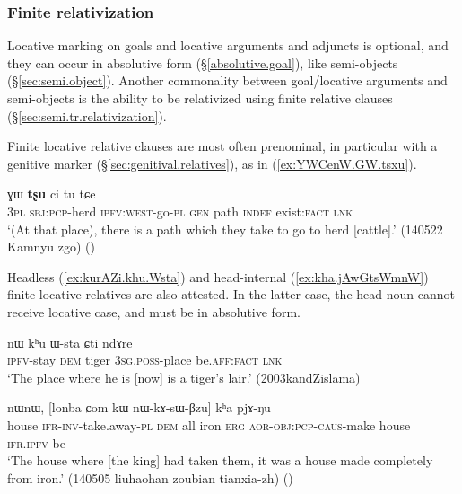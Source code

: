 \subsubsection{Finite relativization}  \label{sec:locative.relativization.finite}
Locative marking on goals and locative arguments and adjuncts is optional, and they can occur in absolutive form (§\ref{absolutive.goal}), like semi-objects (§\ref{sec:semi.object}). Another commonality between goal/locative arguments and semi-objects is the ability to be relativized using finite relative clauses (§\ref{sec:semi.tr.relativization}). 

Finite locative relative clauses are most often prenominal, in particular with a genitive marker (§\ref{sec:genitival.relatives}), as in (\ref{ex:YWCenW.GW.tsxu}).

\begin{exe}
\ex \label{ex:YWCenW.GW.tsxu}
 ɣɯ \textbf{tʂu} ci tu tɕe  \\
\textsc{3pl} \textsc{sbj}:\textsc{pcp}-herd \textsc{ipfv}:\textsc{west}-go-\textsc{pl} \textsc{gen} path \textsc{indef} exist:\textsc{fact} \textsc{lnk} \\
\glt `(At that place), there is a path which they take to go to herd [cattle].' (140522 Kamnyu zgo)
()
\end{exe} 

Headless (\ref{ex:kurAZi.khu.Wsta}) and head-internal (\ref{ex:kha.jAwGtsWmnW}) finite locative relatives are also attested. In the latter case, the head noun cannot receive locative case, and must be in absolutive form.

\begin{exe}
\ex \label{ex:kurAZi.khu.Wsta}
\gll [ku-rɤʑi] nɯ kʰu ɯ-sta ɕti ndɤre \\
\textsc{ipfv}-stay \textsc{dem} tiger \textsc{3sg}.\textsc{poss}-place be.\textsc{aff}:\textsc{fact} \textsc{lnk} \\
\glt `The place where he is [now] is a tiger's lair.' (2003kandZislama)
\end{exe} 

\begin{exe}
\ex \label{ex:kha.jAwGtsWmnW}
 nɯnɯ,  [lonba ɕom kɯ nɯ-kɤ-sɯ-βzu] kʰa pjɤ-ŋu \\
house \textsc{ifr}-\textsc{inv}-take.away-\textsc{pl} \textsc{dem} all iron \textsc{erg} \textsc{aor}-\textsc{obj}:\textsc{pcp}-\textsc{caus}-make house \textsc{ifr}.\textsc{ipfv}-be \\
\glt `The house where [the king] had taken them, it was a house made completely from iron.' (140505 liuhaohan zoubian tianxia-zh)
()
\end{exe}

